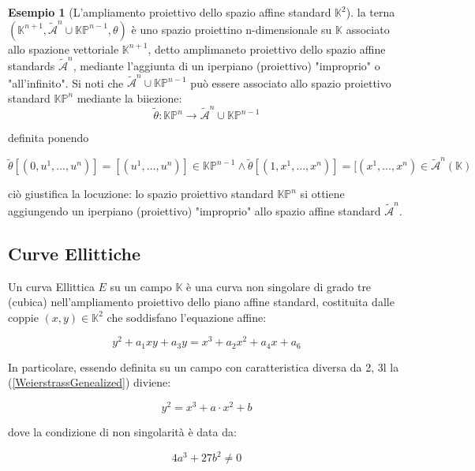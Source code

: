 \documentclass{book}
\theoremstyle{definition}
\newtheorem{esempio}{Esempio}
\newcommand{\CMP}{\mathbb{K}}
\begin{document}
\begin{esempio}[L'ampliamento proiettivo dello spazio affine standard $\mathbb{K}^2$]
la terna $(\CMP^{n+1}, \tilde{\mathcal{A}}^n \cup \mathbb{KP}^{n-1}, \theta)$ è uno spazio proiettino n-dimensionale su $\CMP$ associato allo spazione vettoriale $\CMP^{n+1}$, detto amplimaneto proiettivo dello spazio affine standards $\tilde{\mathcal{A}}^n$, mediante l'aggiunta di un iperpiano (proiettivo) "improprio" o "all'infinito".
Si noti che $\tilde{\mathcal{A}}^n \cup \mathbb{KP}^{n-1}$ può essere associato allo spazio proiettivo standard $\mathbb{KP}^n$ mediante la biiezione:
\[
    \tilde{\theta} : \mathbb{KP}^{n} \rightarrow \tilde{\mathcal{A}}^n \cup \mathbb{KP}^{n-1}
\]

definita ponendo

\[
    \tilde{\theta}[(0, u^{1}, \dots, u^{n})] = [(u^{1}, \dots, u^{n})] \in \mathbb{KP}^{n-1} \land \tilde{\theta}[(1, x^{1}, \dots, x^{n})] = [(x^{1}, \dots, x^{n}) \in \tilde{\mathcal{A}}^n(\CMP)
\]

ciò giustifica la locuzione: lo spazio proiettivo standard $\mathbb{KP}^{n}$ si ottiene aggiungendo un iperpiano (proiettivo) "improprio" allo spazio affine standard $\tilde{\mathcal{A}}^n$.

\end{esempio}

\subsection{Curve Ellittiche}

Un curva Ellittica $E$ su un campo $\mathbb{K}$ è una curva non singolare di grado tre (cubica) nell'ampliamento proiettivo dello piano affine standard, costituita dalle coppie
$(x, y) \in \CMP^2$ che soddisfano l'equazione affine:

\begin{equation}
    \label{WeierstrassGenealized}
    y^{2} + a_{1} x y + a_{3} y = x^{3} + a_{2} x^{2} + a_{4} x + a_{6}
\end{equation}

In particolare, essendo definita su un campo con caratteristica diversa da 2, 3l la (\ref{WeierstrassGenealized}) diviene:

\begin{equation}
    \label{EllipticCurveOverFiniteField}
    y^{2} = x^{3} + a \cdot x^{2} + b
\end{equation}

dove la condizione di non singolarità è data da:

\begin{equation}
    \label{nonSingularCondition}
    4 a^{3} + 27 b^{2} \ne 0
\end{equation}
\end{document}
